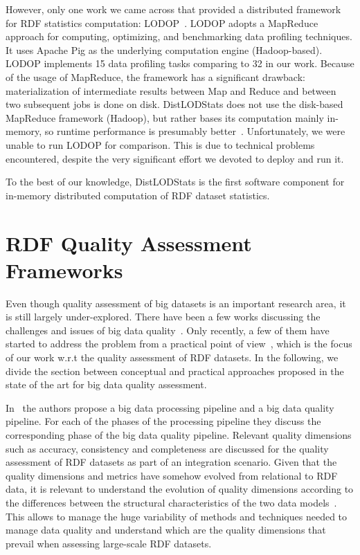 However, only one work we came across that provided a distributed framework for \gls{RDF} statistics computation: LODOP~\cite{Forchhammer:PROFILES:14}.
LODOP adopts a MapReduce approach for computing, optimizing, and benchmarking data profiling techniques.
It uses Apache Pig as the underlying computation engine (Hadoop-based). 
LODOP implements 15 data profiling tasks comparing to 32 in our work. 
Because of the usage of MapReduce, the framework has a significant drawback: materialization of intermediate results between Map and Reduce and between two subsequent jobs is done on disk.
DistLODStats does not use the disk-based MapReduce framework (Hadoop), but rather bases its computation mainly in-memory, so runtime performance is presumably better~\cite{Shi:2015:CTM:2831360.2831365}.
Unfortunately, we were unable to run LODOP for comparison. This is due to technical problems encountered, despite the very significant effort we devoted to deploy and run it.

To the best of our knowledge, DistLODStats is the first software component for in-memory distributed computation of \gls{RDF} dataset statistics. 

\section{RDF Quality Assessment Frameworks}
Even though quality assessment of big datasets is an important research area, it is still largely under-explored. 
There have been a few works discussing the challenges and issues of big data quality~\cite{becker2015big,RaoG015,cai2015challenges}. 
Only recently, a few of them have started to address the problem from a practical point of view~\cite{debattista2016luzzu}, which is the focus of our work w.r.t the quality assessment of \gls{RDF} datasets.
In the following, we divide the section between conceptual and practical approaches proposed in the state of the art for big data quality assessment.

In~\cite{CatarciSCD17} the authors propose a big data processing pipeline and a big data quality pipeline. 
For each of the phases of the processing pipeline they discuss the corresponding phase of the big data quality pipeline.
Relevant quality dimensions such as accuracy, consistency and completeness are discussed for the quality assessment of \gls{RDF} datasets as part of an integration scenario.
Given that the quality dimensions and metrics have somehow evolved from relational to \gls{RDF} data,
it is relevant to understand the evolution of quality dimensions according to the differences between the structural characteristics of the two data models~\cite{BatiniRSV15}. 
This allows to manage the huge variability of methods and techniques needed to manage data quality and understand which are the quality dimensions that prevail when assessing large-scale \gls{RDF} datasets.

